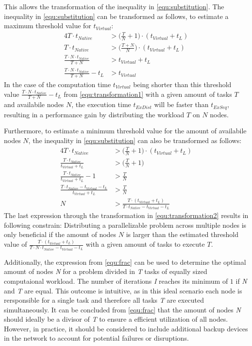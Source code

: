 This allows the transformation of the inequality in \eqref{equ:substitution}. The inequality in \eqref{equ:substitution} can be transformed as follows, to estimate a maximum threshold value for $t_{Virtual}$:
\begin{alignat}{4}
  T \cdot t_{Native} &> \bigg(\frac{T}{N} + 1\bigg) \cdot (t_{Virtual} + t_{L}) \nonumber \\
  T \cdot t_{Native} &> \bigg(\frac{T + N}{N}\bigg) \cdot (t_{Virtual} + t_{L}) \nonumber \\
  \frac{T \cdot N \cdot t_{Native}}{T + N} &> t_{Virtual} + t_{L} \nonumber \\
  \frac{T \cdot N \cdot t_{Native}}{T + N} - t_{L} &> t_{Virtual}
  \label{equ:transformation1}
\end{alignat}
In the case of the computation time $t_{Virtual}$ being shorter than this threshold value $\frac{T \cdot N \cdot t_{Native}}{T + N} - t_{L}$ from \eqref{equ:transformation1} with a given amount of tasks $T$ and availabile nodes $N$, the execution time $t_{ExDist}$ will be faster than $t_{ExSeq}$, resulting in a performance gain by distributing the workload $T$ on $N$ nodes.

Furthermore, to estimate a minimum threshold value for the amount of availabile nodes $N$, the inequality in \eqref{equ:substitution} can also be transformed as follows:
\begin{alignat}{4}
  T \cdot t_{Native} &> \bigg(\frac{T}{N} + 1\bigg) \cdot (t_{Virtual} + t_{L}) \nonumber \\
  \frac{T \cdot t_{Native}}{t_{Virtual} + t_{L}} &> \bigg(\frac{T}{N} + 1\bigg) \nonumber \\
  \frac{T \cdot t_{Native}}{t_{Virtual} + t_{L}} - 1 &> \frac{T}{N} \nonumber \\
  \frac{T \cdot t_{Native} - t_{Virtual} - t_{L}}{t_{Virtual} + t_{L}} &> \frac{T}{N} \nonumber \\
  N &> \frac{T \cdot (t_{Virtual} + t_{L})}{T \cdot t_{Native} - t_{Virtual} - t_{L}}
  \label{equ:transformation2}
\end{alignat}
The last expression through the transformation in \eqref{equ:transformation2} results in following constrain: Distributing a parallelizable problem across multiple nodes is only beneficial if the amount of nodes $N$ is larger than the estimated threshold value of $\frac{T \cdot (t_{Virtual} + t_{L})}{T \cdot N \cdot t_{Native} - t_{Virtual} - t_{L}}$ with a given amount of tasks to execute $T$.

Additionally, the expression from \eqref{equ:frac} can be used to determine the optimal amount of nodes \emph{N} for a problem divided in \emph{T} tasks of equally sized computaional workload. The number of iterations \emph{I} reaches its minimum of $1$ if \emph{N} and \emph{T} are equal. This outcome is intuitive, as in this ideal scenario each node is rersponsible for a single task and therefore all tasks \emph{T} are executed simultaneously. It can be concluded from \eqref{equ:frac} that the amount of nodes \emph{N} should ideally be a divisor of \emph{T} to ensure a efficient utilization of all nodes. However, in practice, it should be considered to include additional backup devices in the network to account for potential failures or disruptions.

